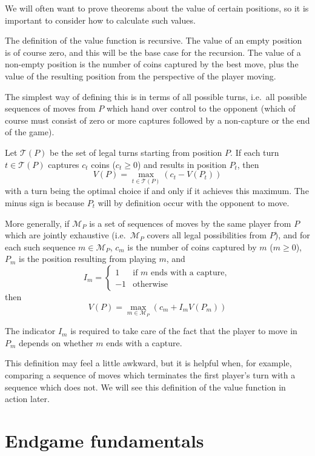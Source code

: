 \documentclass[a4paper,twocolumn]{article}
\begin{document}
We will often want to prove theorems about the value of certain
positions, so it is important to consider how to calculate such
values.

The definition of the value function is recursive. The value of an
empty position is of course zero, and this will be the base case for
the recursion. The value of a non-empty position is the number of
coins captured by the best move, plus the value of the resulting
position from the perspective of the player moving.

The simplest way of defining this is in terms of all possible turns,
i.e.\ all possible sequences of moves from $P$ which hand over control
to the opponent (which of course must consist of zero or more captures
followed by a non-capture or the end of the game).

Let $\mathcal{T}(P)$ be the set of legal turns starting from position
$P$. If each turn $t \in \mathcal{T}(P)$ captures $c_t$ coins ($c_t \ge 0$)
and results in position $P_t$, then $$V(P) = \max_{t \in \mathcal{T}(P)}(c_t - V(P_t))$$
with a turn being the optimal choice if and only if it achieves this
maximum. The minus sign is because $P_t$ will by definition occur
with the opponent to move.

More generally, if $\mathcal{M}_P$ is a set of sequences of moves by
the same player from $P$ which are jointly exhaustive
(i.e.\ $\mathcal{M}_P$ covers all legal possibilities from $P$), and
for each such sequence $m \in \mathcal{M}_P$, $c_m$ is the number of
coins captured by $m$ ($m \ge 0$), $P_m$ is the position resulting
from playing $m$, and
\begin{equation*}
  I_m =
  \begin{cases}
    1 & \text{if $m$ ends with a capture},\\
    -1 & \text{otherwise}
  \end{cases}
\end{equation*}
then $$V(P) = \max_{m \in \mathcal{M}_P}(c_m + I_mV(P_m))$$

The indicator $I_m$ is required to take care of the fact that the
player to move in $P_m$ depends on whether $m$ ends with a capture.

This definition may feel a little awkward, but it is helpful when, for
example, comparing a sequence of moves which terminates the first
player's turn with a sequence which does not. We will see this
definition of the value function in action later.

\section{Endgame fundamentals}\label{endgamesection}
\end{document}
